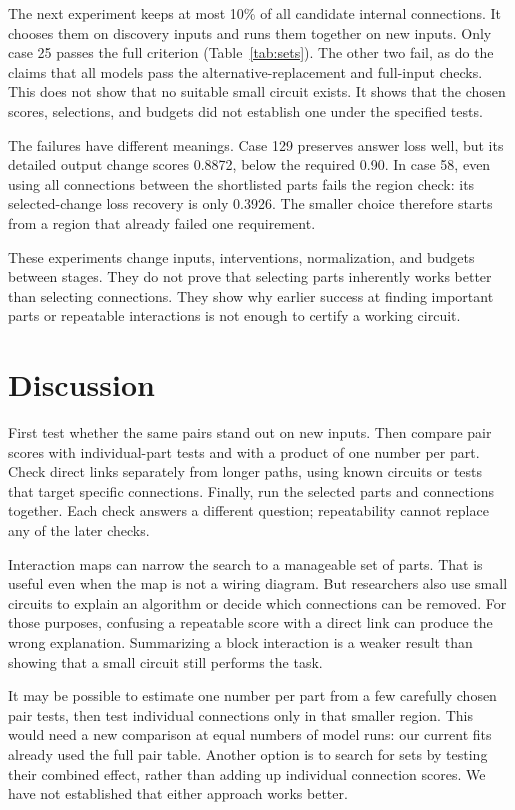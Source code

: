 \documentclass[11pt,letterpaper]{article}
\begin{document}
The next experiment keeps at most 10\% of all candidate internal connections.
It chooses them on discovery inputs and runs them together on new inputs.
Only case 25 passes the full criterion (Table~\ref{tab:sets}). The other two
fail, as do the claims that all models pass the alternative-replacement and
full-input checks. This does not show that no suitable small circuit exists.
It shows that the chosen scores, selections, and budgets did not establish one
under the specified tests.





The failures have different meanings. Case 129 preserves answer loss well,
but its detailed output change scores 0.8872, below the required 0.90. In case
58, even using all connections between the shortlisted parts fails the region
check: its selected-change loss recovery is only 0.3926. The smaller choice
therefore starts from a region that already failed one requirement.

These experiments change inputs, interventions, normalization, and budgets
between stages. They do not prove that selecting parts inherently works better
than selecting connections. They show why earlier success at finding important
parts or repeatable interactions is not enough to certify a working circuit.

\section*{Discussion}
First test whether the same pairs stand out on new inputs. Then compare pair
scores with individual-part tests and with a product of one number per part.
Check direct links separately from longer paths, using known circuits or tests
that target specific connections. Finally, run the selected parts and
connections together. Each check answers a different question; repeatability
cannot replace any of the later checks.


Interaction maps can narrow the search to a manageable set of parts. That is
useful even when the map is not a wiring diagram. But researchers also use
small circuits to explain an algorithm or decide which connections can be
removed. For those purposes, confusing a repeatable score with a direct link
can produce the wrong explanation. Summarizing a block interaction is a
weaker result than showing that a small circuit still performs the task.


It may be possible to estimate one number per part from a few carefully chosen
pair tests, then test individual connections only in that smaller region.
This would need a new comparison at equal numbers of model runs: our current
fits already used the full pair table. Another option is to search for sets
by testing their combined effect, rather than adding up individual connection
scores. We have not established that either approach works better.
\end{document}
